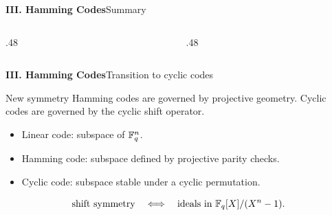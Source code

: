 \begin{frame}{\textbf{III. Hamming Codes}}{Summary}
\small
\begin{columns}[T,onlytextwidth]
  \begin{column}{.48\textwidth}
  \end{column}
  \begin{column}{.48\textwidth}
  \end{column}
\end{columns}
\end{frame}

\begin{frame}{\textbf{III. Hamming Codes}}{Transition to cyclic codes}
\small
\begin{block}{New symmetry}
Hamming codes are governed by projective geometry. Cyclic codes are governed by the cyclic shift operator.
\end{block}
\begin{itemize}
  \item Linear code: subspace of $\mathbb{F}_q^n$.
  \item Hamming code: subspace defined by projective parity checks.
  \item Cyclic code: subspace stable under a cyclic permutation.
\end{itemize}
\[
  \text{shift symmetry}\quad\Longleftrightarrow\quad\text{ideals in }\mathbb{F}_q[X]/(X^n-1).
\]
\end{frame}

